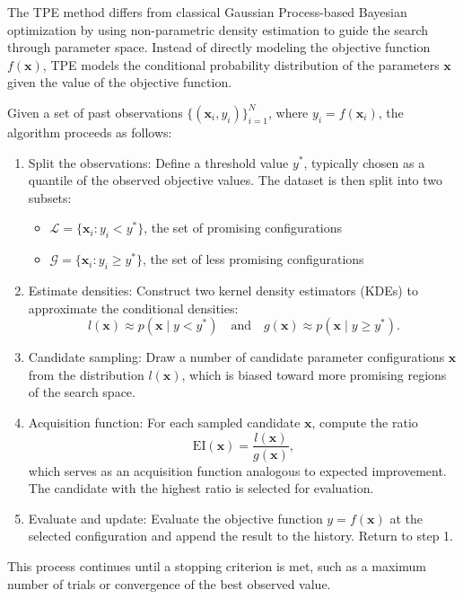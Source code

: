 The TPE method differs from classical Gaussian Process-based Bayesian optimization by using non-parametric density estimation to guide the search through parameter space. 
Instead of directly modeling the objective function $f(\mathbf{x})$, TPE models the conditional probability distribution of the parameters $\mathbf{x}$ given the value of the objective function.

Given a set of past observations $\{ (\mathbf{x}_i, y_i) \}_{i=1}^N$, where $ y_i = f(\mathbf{x}_i) $, the algorithm proceeds as follows:

\begin{enumerate}
    \item Split the observations: Define a threshold value $ y^* $, typically chosen as a quantile of the observed objective values. 
        The dataset is then split into two subsets:
        \begin{itemize}
            \item $\mathcal{L} = \{ \mathbf{x}_i : y_i < y^* \}$, the set of promising configurations
            \item $\mathcal{G} = \{ \mathbf{x}_i : y_i \geq y^* \}$, the set of less promising configurations
        \end{itemize}
    \item Estimate densities: Construct two kernel density estimators (KDEs) to approximate the conditional densities:
    \[
    l(\mathbf{x}) \approx p(\mathbf{x} \mid y < y^*) \quad \text{and} \quad g(\mathbf{x}) \approx p(\mathbf{x} \mid y \geq y^*).
    \]
    \item Candidate sampling: Draw a number of candidate parameter configurations $\mathbf{x}$ from the distribution $l(\mathbf{x})$, which is biased toward more promising regions of the search space.
    \item Acquisition function: For each sampled candidate $\mathbf{x}$, compute the ratio
    \[
    \text{EI}(\mathbf{x}) = \frac{l(\mathbf{x})}{g(\mathbf{x})},
    \]
    which serves as an acquisition function analogous to expected improvement. The candidate with the highest ratio is selected for evaluation.
    \item Evaluate and update: Evaluate the objective function $ y = f(\mathbf{x}) $ at the selected configuration and append the result to the history. Return to step 1.
\end{enumerate}
This process continues until a stopping criterion is met, such as a maximum number of trials or convergence of the best observed value.

